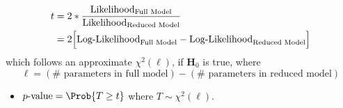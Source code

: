 \begin{itemize}
          \begin{align*}
              t & =2\log*{\frac{\text{Likelihood}_{\text{Full Model}}}{\text{Likelihood}_{\text{Reduced Model}}}}      \\
                & =2\Bigl[\text{Log-Likelihood}_{\text{Full Model}}-\text{Log-Likelihood}_{\text{Reduced Model}}\Bigr]
          \end{align*}
          which follows an approximate $ \chi^2(\ell) $, if $ \mathbf{H}_0 $ is true, where
          \[ \ell=(\#\text{ parameters in full model})-(\#\text{ parameters in reduced model}) \]
          \begin{itemize}
              \item $ p\text{-value}=\Prob{T\ge t} $ where $ T \sim \chi^2(\ell) $.
          \end{itemize}
\end{itemize}
